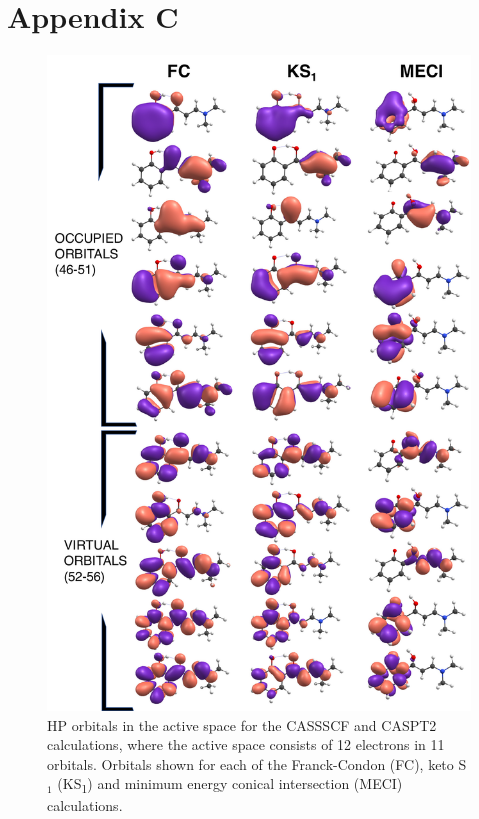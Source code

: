 \documentclass[a4paper]{report}
\def\sone{S$_{1}$}
\begin{document}
\section*{Appendix C}
\label{appendix2}
\begin{figure}[H]
\centering
  \includegraphics[width=0.9\linewidth]{Misc/CAS_ORBITALS.pdf}
  \caption[CASSCF and CASPT2 space used in Chapter \ref{chapter: Connecting}.]{HP orbitals in the active space for the CASSSCF and CASPT2 calculations, where the active space consists of 12 electrons in 11 orbitals. Orbitals shown for each of the Franck-Condon (FC), keto \sone{} (KS\textsubscript{1}) and minimum energy conical intersection (MECI) calculations.}
  \label{figure: HP_CASSCF_Orbitals}
\end{figure}
\end{document}
